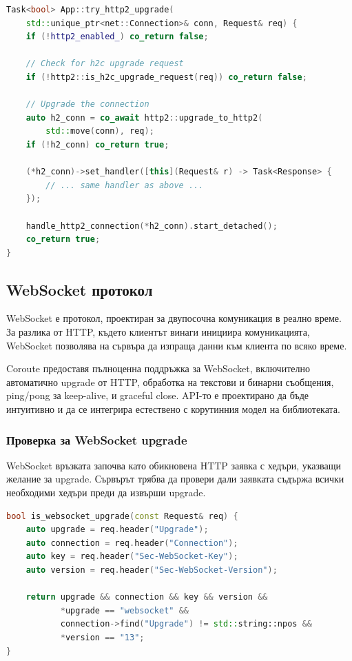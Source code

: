 \begin{lstlisting}[language=C++, basicstyle=\small\ttfamily, caption={h2c upgrade}]
Task<bool> App::try_http2_upgrade(
    std::unique_ptr<net::Connection>& conn, Request& req) {
    if (!http2_enabled_) co_return false;
    
    // Check for h2c upgrade request
    if (!http2::is_h2c_upgrade_request(req)) co_return false;
    
    // Upgrade the connection
    auto h2_conn = co_await http2::upgrade_to_http2(
        std::move(conn), req);
    if (!h2_conn) co_return true;
    
    (*h2_conn)->set_handler([this](Request& r) -> Task<Response> {
        // ... same handler as above ...
    });
    
    handle_http2_connection(*h2_conn).start_detached();
    co_return true;
}
\end{lstlisting}

\subsection{WebSocket протокол}

WebSocket \cite{rfc6455} е протокол, проектиран за двупосочна комуникация в реално време. За разлика от HTTP, където клиентът винаги инициира комуникацията, WebSocket позволява на сървъра да изпраща данни към клиента по всяко време.

Coroute предоставя пълноценна поддръжка за WebSocket, включително автоматично upgrade от HTTP, обработка на текстови и бинарни съобщения, ping/pong за keep-alive, и graceful close. API-то е проектирано да бъде интуитивно и да се интегрира естествено с корутинния модел на библиотеката.

\subsubsection{Проверка за WebSocket upgrade}

WebSocket връзката започва като обикновена HTTP заявка с хедъри, указващи желание за upgrade. Сървърът трябва да провери дали заявката съдържа всички необходими хедъри преди да извърши upgrade.

\begin{lstlisting}[language=C++, basicstyle=\small\ttfamily, caption={WebSocket upgrade detection}]
bool is_websocket_upgrade(const Request& req) {
    auto upgrade = req.header("Upgrade");
    auto connection = req.header("Connection");
    auto key = req.header("Sec-WebSocket-Key");
    auto version = req.header("Sec-WebSocket-Version");
    
    return upgrade && connection && key && version &&
           *upgrade == "websocket" &&
           connection->find("Upgrade") != std::string::npos &&
           *version == "13";
}
\end{lstlisting}

